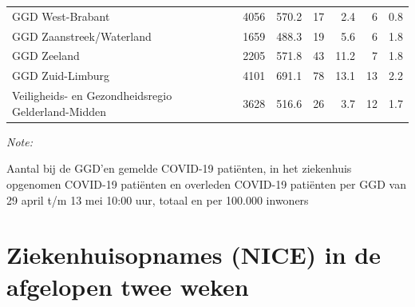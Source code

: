 \documentclass[
  english,
  man,floatsintext]{apa6}
\begin{document}
\begin{table}
\begin{threeparttable}
\begin{tabular}{lrrrrrr}
GGD West-Brabant & 4056 & 570.2 & 17 & 2.4 & 6 & 0.8\\
GGD Zaanstreek/Waterland & 1659 & 488.3 & 19 & 5.6 & 6 & 1.8\\
GGD Zeeland & 2205 & 571.8 & 43 & 11.2 & 7 & 1.8\\
GGD Zuid-Limburg & 4101 & 691.1 & 78 & 13.1 & 13 & 2.2\\
Veiligheids- en Gezondheidsregio Gelderland-Midden & 3628 & 516.6 & 26 & 3.7 & 12 & 1.7\\
\bottomrule
\end{tabular}
\begin{tablenotes}
\item \textit{Note: } 
\item Aantal bij de GGD’en gemelde COVID-19 patiënten, in het ziekenhuis opgenomen COVID-19 patiënten en overleden COVID-19 patiënten per GGD van 29 april t/m 13 mei 10:00 uur, totaal en per 100.000 inwoners
\end{tablenotes}
\end{threeparttable}
\endgroup{}
\end{table}

\newpage

\hypertarget{ziekenhuisopnames-nice-in-de-afgelopen-twee-weken}{%
\section{Ziekenhuisopnames (NICE) in de afgelopen twee weken}\label{ziekenhuisopnames-nice-in-de-afgelopen-twee-weken}}
\end{document}
